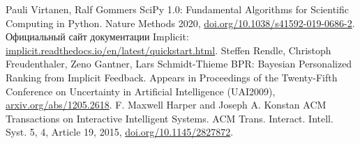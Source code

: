 \documentclass[a4paper,article,12pt]{extarticle}
\begin{document}
\begin{thebibliography}{1}
 Pauli Virtanen, Ralf Gommers \flqq SciPy 1.0: Fundamental Algorithms for Scientific
Computing in Python\frqq. Nature Methods 2020, \href{https://doi.org/10.1038/s41592-019-0686-2}{doi.org/10.1038/s41592-019-0686-2}.
 Официальный сайт документации Implicit: \href{https://implicit.readthedocs.io/en/latest/quickstart.html}{implicit.readthedocs.io/en/latest/quickstart.html}.
 Steffen Rendle, Christoph Freudenthaler, Zeno Gantner, Lars Schmidt-Thieme \flqq BPR: Bayesian Personalized Ranking from Implicit Feedback\frqq. 	Appears in Proceedings of the Twenty-Fifth Conference on Uncertainty in Artificial Intelligence (UAI2009), \href{https://arxiv.org/abs/1205.2618}{arxiv.org/abs/1205.2618}.
 F. Maxwell Harper and Joseph A. Konstan \flqq ACM Transactions on Interactive Intelligent Systems\frqq. ACM Trans. Interact. Intell. Syst. 5, 4, Article 19, 2015, \href{https://doi.org/10.1145/2827872}{doi.org/10.1145/2827872}.
\end{thebibliography}
\end{document}
